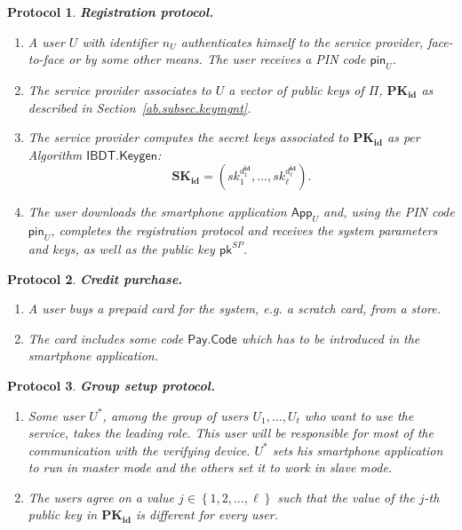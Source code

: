 \documentclass[11pt]{llncs}
\newtheorem{proto}{Protocol}
\begin{document}
\begin{proto}
\textbf{Registration protocol.}
\begin{enumerate}
\item A user $U$ with identifier $n_U$ authenticates
himself to the service provider, face-to-face or by some other
means. The user receives a PIN code $\mathsf{pin}_U$.
\item The service provider associates to $U$ a vector of public keys of $\Pi$,
$\mathbf{PK_{id}}$ as described in Section~\ref{ab.subsec.keymgnt}.
\item The service provider computes the secret keys
associated to $\mathbf{PK_{id}}$
as per Algorithm $\mathsf{IBDT.Keygen}$:
$$\mathbf{SK_{id}} = \left( sk_{1}^{d_1^\mathbf{id}}, \dots , sk_{\ell}^{d_\ell^\mathbf{id}} \right).$$
\item The user downloads the smartphone application $\mathsf{App}_U$ and, using
the PIN code $\mathsf{pin}_U$, completes the registration protocol and
receives the system parameters and keys, as well as the
public key $\mathsf{pk}^{SP}$.
\end{enumerate}
\end{proto}

\begin{proto}
\textbf{Credit purchase.}
\begin{enumerate}
\item A user buys a prepaid card for the system, \emph{e.g}. a scratch card,
from a store.
\item The card includes some code $\mathsf{Pay.Code}$ which has to be
introduced in the smartphone application.
\end{enumerate}
\end{proto}

\begin{proto}\label{ab.proto.gsetup}
\textbf{Group setup protocol.}
\begin{enumerate}
\item Some user $U^*$, among the group of users $U_1,\dots , U_t$ who want
to use the service, takes the leading role. This user
will be responsible for most of the
communication with the verifying device. $U^*$ sets his smartphone
application to run in master mode and the others set it to work in slave mode.
\item The users agree on a value $j \in \left\{ 1, 2, \dots , \ell \right\}$ such that the
value of the $j$-th public key in $\mathbf{PK_{id}}$ is different for every user.
\end{enumerate}
\end{proto}
\end{document}
